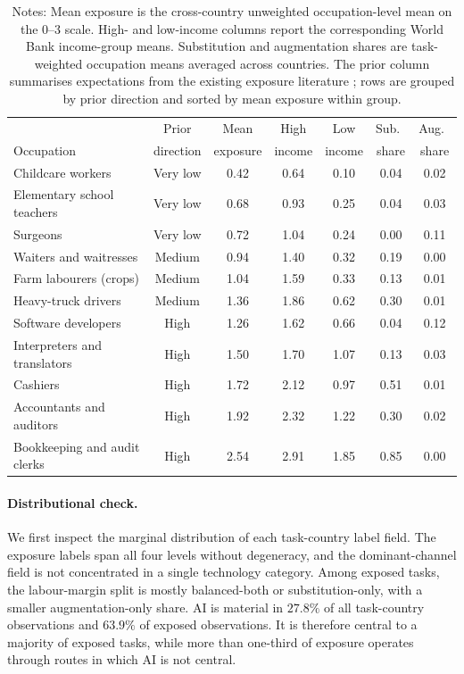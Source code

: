 \documentclass[11pt]{article}
\begin{document}
\begin{table}[H]
\centering
\footnotesize
\caption{Exposure for anchor occupations where the existing literature has strong priors.}
\label{tab:validation_anchor_occupations}
\begin{tabular}{@{}lcccccc@{}}
\toprule
& Prior & Mean & High & Low & Sub.\ & Aug.\ \\
Occupation & direction & exposure & income & income & share & share \\
\midrule
Childcare workers & Very low & 0.42 & 0.64 & 0.10 & 0.04 & 0.02 \\
Elementary school teachers & Very low & 0.68 & 0.93 & 0.25 & 0.04 & 0.03 \\
Surgeons & Very low & 0.72 & 1.04 & 0.24 & 0.00 & 0.11 \\
Waiters and waitresses & Medium & 0.94 & 1.40 & 0.32 & 0.19 & 0.00 \\
Farm labourers (crops) & Medium & 1.04 & 1.59 & 0.33 & 0.13 & 0.01 \\
Heavy-truck drivers & Medium & 1.36 & 1.86 & 0.62 & 0.30 & 0.01 \\
Software developers & High & 1.26 & 1.62 & 0.66 & 0.04 & 0.12 \\
Interpreters and translators & High & 1.50 & 1.70 & 1.07 & 0.13 & 0.03 \\
Cashiers & High & 1.72 & 2.12 & 0.97 & 0.51 & 0.01 \\
Accountants and auditors & High & 1.92 & 2.32 & 1.22 & 0.30 & 0.02 \\
Bookkeeping and audit clerks & High & 2.54 & 2.91 & 1.85 & 0.85 & 0.00 \\
\bottomrule
\end{tabular}
\caption*{\scriptsize Notes: Mean exposure is the cross-country unweighted occupation-level mean on the 0--3 scale. High- and low-income columns report the corresponding World Bank income-group means. Substitution and augmentation shares are task-weighted occupation means averaged across countries. The prior column summarises expectations from the existing exposure literature \citep{frey2017future,Webb2020,felten2021occupational,EloundouEtAl2024}; rows are grouped by prior direction and sorted by mean exposure within group.}
\end{table}

\paragraph{Distributional check.} We first inspect the marginal distribution of each task-country label field. The exposure labels span all four levels without degeneracy, and the dominant-channel field is not concentrated in a single technology category. Among exposed tasks, the labour-margin split is mostly balanced-both or substitution-only, with a smaller augmentation-only share. AI is material in $27.8\%$ of all task-country observations and $63.9\%$ of exposed observations. It is therefore central to a majority of exposed tasks, while more than one-third of exposure operates through routes in which AI is not central.
\end{document}
